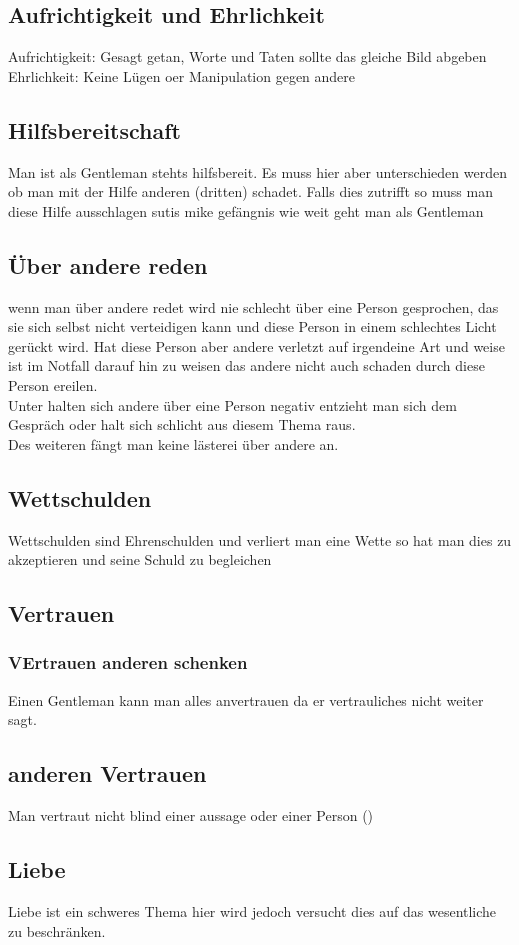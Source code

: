         \subsection{Aufrichtigkeit und Ehrlichkeit}
            Aufrichtigkeit: Gesagt getan, Worte und Taten sollte das gleiche Bild abgeben
            Ehrlichkeit: Keine Lügen oer Manipulation gegen andere 
        \subsection{Hilfsbereitschaft}
            Man ist als Gentleman stehts hilfsbereit. Es muss hier aber unterschieden werden ob man mit der Hilfe anderen (dritten) schadet. Falls dies zutrifft so muss man diese Hilfe ausschlagen {\color{red}sutis mike gefängnis}
            wie weit geht man als Gentleman 
        \subsection{Über andere reden}
            wenn man über andere redet wird nie schlecht über eine Person gesprochen, das sie sich selbst nicht verteidigen kann und diese Person in einem schlechtes Licht gerückt wird. Hat diese Person aber andere verletzt auf irgendeine Art und weise ist im Notfall darauf hin zu weisen das andere nicht auch schaden durch diese Person ereilen. \\
            Unter halten sich andere über eine Person negativ entzieht man sich dem Gespräch oder halt sich schlicht aus diesem Thema raus. \\
            Des weiteren fängt man keine lästerei über andere an. 
        \subsection{Wettschulden}  
            Wettschulden sind Ehrenschulden und verliert man eine Wette so hat man dies zu akzeptieren und seine Schuld zu begleichen 
        \subsection{Vertrauen}
            \subsubsection{VErtrauen anderen schenken}
                Einen Gentleman kann man alles anvertrauen da er vertrauliches nicht weiter sagt.
            \subsection{anderen Vertrauen}  
                Man vertraut nicht blind einer aussage oder einer Person ()
        \subsection{Liebe}
            Liebe ist ein schweres Thema hier wird jedoch versucht dies auf das wesentliche zu beschränken. 
        

    
